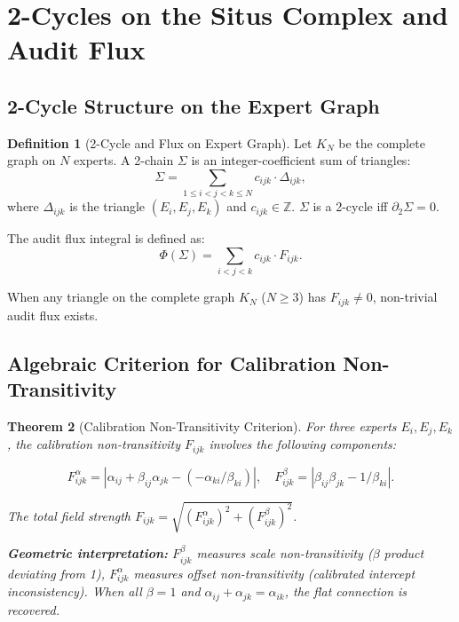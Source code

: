 \documentclass[12pt,a4paper]{article}
\theoremstyle{plain}
\newtheorem{theorem}{Theorem}
\theoremstyle{definition}
\newtheorem{definition}[theorem]{Definition}
\theoremstyle{remark}
\newcommand{\Z}{\mathbb{Z}}
\newcommand{\bd}{\partial}
\begin{document}
\section{2-Cycles on the Situs Complex and Audit Flux}
\label{sec:2cycles}

\subsection{2-Cycle Structure on the Expert Graph}
\label{sec:2cycle_construction}

\begin{definition}[2-Cycle and Flux on Expert Graph]
\label{def:2cycle_flux}
Let $K_N$ be the complete graph on $N$ experts. A 2-chain $\Sigma$ is an integer-coefficient sum of triangles:
\begin{equation}\label{eq:2chain}
    \Sigma = \sum_{1 \leq i < j < k \leq N} c_{ijk} \cdot \Delta_{ijk},
\end{equation}
where $\Delta_{ijk}$ is the triangle $(E_i, E_j, E_k)$ and $c_{ijk} \in \Z$. $\Sigma$ is a 2-cycle iff $\bd_2 \Sigma = 0$.

The audit flux integral is defined as:
\begin{equation}\label{eq:flux_integral}
    \Phi(\Sigma) = \sum_{i<j<k} c_{ijk} \cdot F_{ijk}.
\end{equation}

When any triangle on the complete graph $K_N$ ($N \geq 3$) has $F_{ijk} \neq 0$, non-trivial audit flux exists.
\end{definition}

\subsection{Algebraic Criterion for Calibration Non-Transitivity}
\label{sec:algebraic_criterion}

\begin{theorem}[Calibration Non-Transitivity Criterion]
\label{thm:2cycle_computation}
For three experts $E_i, E_j, E_k$, the calibration non-transitivity $F_{ijk}$ involves the following components:

\begin{equation}\label{eq:F_components}
    F_{ijk}^\alpha = |\alpha_{ij} + \beta_{ij}\alpha_{jk} - (-\alpha_{ki}/\beta_{ki})|, \quad
    F_{ijk}^\beta = |\beta_{ij}\beta_{jk} - 1/\beta_{ki}|.
\end{equation}

The total field strength $F_{ijk} = \sqrt{(F_{ijk}^\alpha)^2 + (F_{ijk}^\beta)^2}$.

\textbf{Geometric interpretation:} $F_{ijk}^\beta$ measures scale non-transitivity ($\beta$ product deviating from 1), $F_{ijk}^\alpha$ measures offset non-transitivity (calibrated intercept inconsistency). When all $\beta = 1$ and $\alpha_{ij} + \alpha_{jk} = \alpha_{ik}$, the flat connection is recovered.
\end{theorem}
\end{document}
